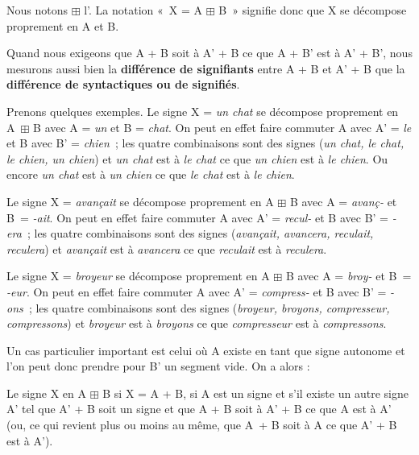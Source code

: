 \begin{styleLivreImportant}
Nous notons ${\boxplus}$ l’. La notation «~X = A ${\boxplus}$ B~» signifie donc que X se décompose proprement en A et B.
\end{styleLivreImportant}

Quand nous exigeons que A + B soit à A’ + B ce que A + B’ est à A’ + B’, nous mesurons aussi bien la \textbf{différence de signifiants} entre A + B et A’ + B que la \textbf{différence de syntactiques ou de signifiés}.

Prenons quelques exemples. Le signe X = \textit{un chat} se décompose proprement en A~${\boxplus}$ B avec A = \textit{un} et B = \textit{chat}. On peut en effet faire commuter A avec A’ = \textit{le} et B avec B’ = \textit{chien~}; les quatre combinaisons sont des signes (\textit{un chat, le chat, le chien, un chien}) et \textit{un chat} est à \textit{le chat} ce que \textit{un chien} est à \textit{le chien}. Ou encore \textit{un chat} est à \textit{un chien} ce que \textit{le chat} est à \textit{le chien}.

Le signe X = \textit{avançait} se décompose proprement en A ${\boxplus}$ B avec A = \textit{avanç-} et B~= \textit{{}-ait}. On peut en effet faire commuter A avec A’ = \textit{recul-} et B avec B’ = \textit{{}-era~}; les quatre combinaisons sont des signes (\textit{avançait, avancera, reculait, reculera}) et \textit{avançait} est à \textit{avancera} ce que \textit{reculait} est à \textit{reculera}.

Le signe X = \textit{broyeur} se décompose proprement en A ${\boxplus}$ B avec A = \textit{broy-} et B~=  \textit{{}-eur}. On peut en effet faire commuter A avec A’ = \textit{compress-} et B avec B’ =     \textit{{}-ons~}; les quatre combinaisons sont des signes (\textit{broyeur, broyons, compresseur, compressons}) et \textit{broyeur} est à \textit{broyons} ce que \textit{compresseur} est à \textit{compressons}.

Un cas particulier important est celui où A existe en tant que signe autonome et l’on peut donc prendre pour B’ un segment vide. On a alors :

\begin{styleLivreImportant}
Le signe X  en A ${\boxplus}$ B si X = A + B, si A est un signe et s’il existe un autre signe A’ tel que A’ + B soit un signe et que A + B soit à A’ + B ce que A est à A’ (ou, ce qui revient plus ou moins au même, que A~+ B soit à A ce que A’ + B est à A’).
\end{styleLivreImportant}

